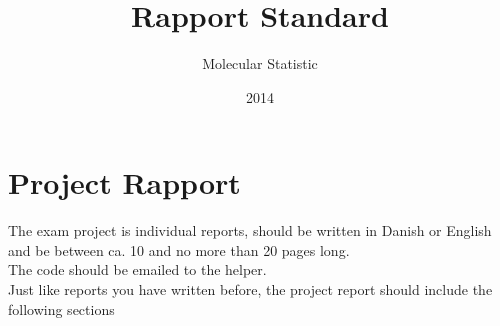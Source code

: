 \documentclass{article}
\title{Rapport Standard}
\author{Molecular Statistic}
\date{2014}
\begin{document}


\maketitle

\section*{Project Rapport}

The exam project is individual reports, should be written in Danish or English and be between ca. 10 and no more than 20 pages long.\\

The code should be emailed to the helper.\\

Just like reports you have written before, the project report should include the following sections
\end{document}
